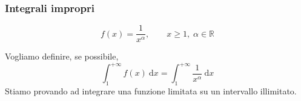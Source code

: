\subsubsection{Integrali impropri}
\begin{exbar}
\begin{example}
	\begin{equation*}
		f(x)=\frac{1}{x^\alpha}, \qquad x \geq 1, \; \alpha \in \mathbb{R}
	\end{equation*}
	
	Vogliamo definire, se possibile, 
	\begin{equation*}
		\int_{1}^{+\infty} f(x) \ \mathrm{d}x= \int_{1}^{+\infty}\frac{1}{x^\alpha} \ \mathrm{d}x
	\end{equation*}
	Stiamo provando ad integrare una funzione limitata su un intervallo illimitato.
	
\begin{comment}
	\begin{figure}[h!]
		\centering
		\texttt{[image: unosuxallaalpha.png]}
	\end{figure}
	
	Fissato $c > 1$, riesco a definire $\int_{1}^{c} f(x)dx$ perchè integro una funzione limitata su un intervallo limitato.\\
	Posso dunque definire
	\begin{empheq}{align*}
		\int_{1}^{+\infty} f(x)dx &=\lim_{c\rightarrow +\infty} \int_{1}^{c}f(x)dx, \,\,\,\,\, \text{se}\,\,\, \exists\\
		\int_{1}^{+\infty} \frac{1}{x^\alpha} dx &= \lim_{c \rightarrow + \infty}\int_{1}^{c} \frac{1}{x^\alpha}dx\\
		&=
		\begin{cases}
			& \lim_{c \rightarrow +\infty}\frac{1}{1-\alpha}[c^{1-\alpha}-1]\,\,\,\, \text{se}\,\,\, \alpha \neq 1\\
			& \lim_{c \rightarrow +\infty} \ln c \,\,\,\, \text{se} \,\,\, \alpha=1
		\end{cases}\\
		&=
		\begin{cases}
			& \frac{1}{\alpha-1} \,\,\,\, \text{se} \,\,\, \alpha > 1\\
			&+\infty \,\,\,\, \text{se} \,\,\, \alpha \leq 1
		\end{cases}
	\end{empheq}
	
	\paragraph{\textcolor{red}{Esempio}}
	\begin{empheq}{equation*}
		f(x)=-\ln x, \,\,\, x \in ]0,1]
	\end{empheq}
	e provo a definire 
	\begin{empheq}{equation*}
		\int_{0}^{1} f(x)dx
	\end{empheq}
	cioè l'integrale di una funzione illimitata su un intervallo limitato.\\
\end{example}
\end{exbar}



\end{comment}
\end{example}
\end{exbar}
